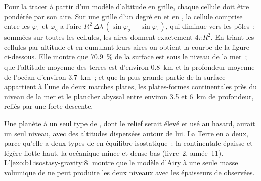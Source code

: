 Pour la tracer à partir d'un modèle d'altitude en grille, chaque cellule doit être
pondérée par son aire. Sur une grille d'un degré en  et en , la
cellule comprise entre les  $\varphi_1$ et $\varphi_2$ a l'aire
$R^2\,\Delta\lambda\,(\sin\varphi_2 - \sin\varphi_1)$, qui diminue vers les
pôles~; sommées sur toutes les cellules, les aires donnent exactement $4\pi R^2$. En
triant les cellules par altitude et en cumulant leurs aires on obtient la courbe de
la figure ci-dessous. Elle montre que \qty{70.9}{\percent} de la surface est sous le
niveau de la mer~; que l'altitude moyenne des terres est d'environ \qty{0.8}{km} et
la profondeur moyenne de l'océan d'environ \qty{3.7}{km}~; et que la plus grande
partie de la surface appartient à l'une de deux marches plates, les plates-formes
continentales près du niveau de la mer et le plancher abyssal entre environ 3.5 et
\qty{6}{km} de profondeur, reliés par une forte descente.

Une planète à un seul type de , dont le relief serait élevé et usé au hasard,
aurait un seul niveau, avec des altitudes dispersées autour de lui. La Terre en a
deux, parce qu'elle a deux types de  en équilibre isostatique~: la 
continentale épaisse et légère flotte haut, la  océanique mince et dense bas
(livre~2, année~11). L'\cref{exo:b1:isostasy-gravity:8} montre que le modèle d'Airy
à une seule masse volumique de  ne peut produire les deux niveaux avec les
épaisseurs de  observées.

